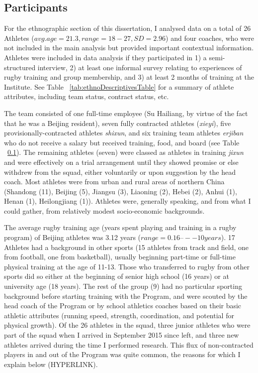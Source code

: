 \begin{CJK}{UTF8}{gbsn}
\subsection{Participants}
For the ethnographic section of this dissertation, I analysed data on a total of 26 Athletes ($avg. age = 21.3, range = 18-27, SD = 2.96$) and four coaches, who were not included in the main analysis but provided important contextual information.  Athletes were included in data analysis if they participated in 1) a semi-structured interview, 2) at least one informal survey relating to experiences of rugby training and group membership, and 3) at least 2 months of training at the Institute.  See Table ~\ref{tab:ethnoDescriptivesTable} for a summary of athlete attributes, including team status, contract status, etc.



The team consisted of one full-time employee (Su Hailiang, by virtue of the fact that he was a Beijing resident), seven fully contracted athletes (\textit{xieyi}), five provisionally-contracted athletes \textit{shixun}, and six training team athletes \textit{erjiban} who do not receive a salary but received training, food, and board (see Table ~\ref{}).  The remaining athletes (seven) were classed as athletes in training \textit{jixun} and were effectively on a trial arrangement until they showed promise or else withdrew from the squad, either voluntarily or upon suggestion by the head coach.  Most athletes were from urban and rural areas of northern China (Shandong (11), Beijing (5), Jiangsu (3), Liaoning (2), Hebei (2), Anhui (1), Henan (1), Heilongjiang (1)). Athletes were, generally speaking, and from what I could gather, from relatively modest socio-economic backgrounds.

The average rugby training age (years spent playing and training in a rugby program) of Beijing athletes was 3.12 years ($range = 0.16 –-- 10 years$).  17 Athletes had a background in other sports (15 athletes from track and field, one from football, one from basketball), usually beginning part-time or full-time physical training at the age of 11-13.  Those who transferred to rugby from other sports did so either at the beginning of senior high school (16 years) or at university age (18 years).  The rest of the group (9) had no particular sporting background before starting training with the Program, and were scouted by the head coach of the Program or by school athletics coaches based on their basic athletic attributes (running speed, strength, coordination, and potential for physical growth).  Of the 26 athletes in the squad, three junior athletes who were part of the squad when I arrived in September 2015 since left, and three new athletes arrived during the time I performed research. This flux of non-contracted players in and out of the Program was quite common, the reasons for which I explain below (HYPERLINK).


\end{CJK}
